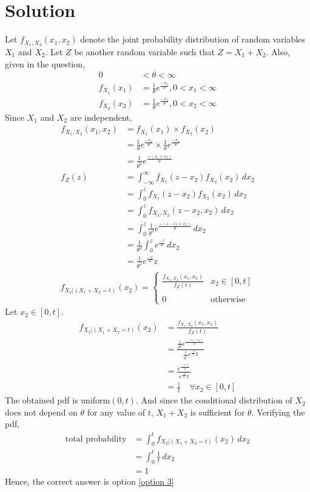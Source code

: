 \documentclass[journal,12pt,twocolumn]{IEEEtran}
\begin{document}
\section*{Solution}
Let $f_{X_1,X_2}(x_1,x_2)$ denote the joint probability distribution of random variables $X_1$ and $X_2$. Let $Z$ be another random variable such that $Z=X_1+X_2$. Also, given in the question,
\begin{align}
    0 &< \theta < \infty
    \\f_{X_1}(x_1) &= \frac{1}{\theta}e^{\frac{-x_1}{\theta}}, 0<x_1<\infty
    \\f_{X_2}(x_2) &= \frac{1}{\theta}e^{\frac{-x_2}{\theta}}, 0<x_2<\infty
\end{align}
Since $X_1$ and $X_2$ are independent, 
\begin{align}
f_{X_1,X_2}(x_1,x_2) &= f_{X_1}(x_1) \times f_{X_2}(x_2)
    \\&= \frac{1}{\theta}e^{\frac{-x_1}{\theta}} \times \frac{1}{\theta}e^{\frac{-x_2}{\theta}}
    \\&= \frac{1}{\theta^2}e^{\frac{-(x_1+x_2)}{\theta}}
    \\f_Z(z) &=  \int_{-\infty}^{\infty} f_{X_1}(z-x_2)f_{X_2}(x_2) \,dx_2 
    \\&= \int_{0}^{z} f_{X_1}(z-x_2)f_{X_2}(x_2) \,dx_2
    \\&= \int_{0}^{z} f_{X_1,X_2}(z-x_2, x_2) \,dx_2
    \\&= \int_{0}^{z} \frac{1}{\theta^2}e^{\frac{-(z-x_2+x_2)}{\theta}} \,dx_2
    \\&= \frac{1}{\theta^2}\int_{0}^{z} e^{\frac{-z}{\theta}} \,dx_2
    \\&= \frac{1}{\theta^2}e^{\frac{-z}{\theta}}z
\end{align}
\begin{align}
    f_{X_2|(X_1+X_2=t)}(x_2) = 
    \begin{cases}
    \frac{f_{X_1,X_2}(x_1,x_2)}{f_Z(t)} &  x_2 \in [0, t]\\ ~\\[-1em]
    0 & \text{otherwise}
    \end{cases}
\end{align}
Let $ x_2 \in [0, t]$.
\begin{align}
    f_{X_2|(X_1+X_2=t)}(x_2) &= \frac{f_{X_1,X_2}(x_1,x_2)}{f_Z(t)}
    \\&= \frac{\frac{1}{\theta^2}e^{\frac{-(x_1+x_2)}{\theta}}}{\frac{1}{\theta^2}e^{\frac{-t}{\theta}}t}
    \\&= \frac{e^{\frac{-(t)}{\theta}}}{e^{\frac{-t}{\theta}}t}
    \\&= \frac{1}{t} \quad \forall x_2 \in [0, t]
\end{align}
The obtained pdf is uniform$(0,t)$. And since the conditional distribution of $X_2$ does not depend on $\theta$ for any value of $t$, $X_1+X_2$ is sufficient for $\theta$. Verifying the pdf,
\begin{align}
    \text{total probability} &= \int_{0}^{t} f_{X_2|(X_1+X_2=t)}(x_2) \,dx_2
    \\&= \int_{0}^{t} \frac{1}{t} \,dx_2
    \\&= 1
\end{align}
Hence, the correct answer is option \eqref{option 3}
\end{document}
